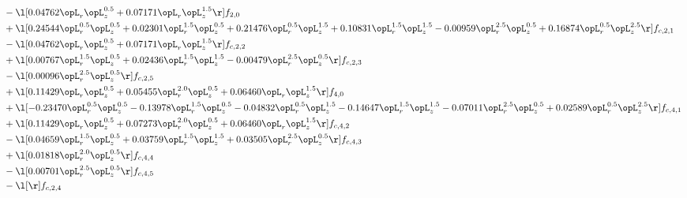 \begin{alignat}{2}
& - \l[  0.04762 \opL_r \opL_z^{0.5} +  0.07171 \opL_r \opL_z^{1.5}  \r] f_{2,0} \nonumber \\ 
& + \l[  0.24544 \opL_r^{0.5} \opL_z^{0.5} +  0.02301 \opL_r^{1.5} \opL_z^{0.5} +  0.21476 \opL_r^{0.5} \opL_z^{1.5} +  0.10831 \opL_r^{1.5} \opL_z^{1.5}   -0.00959 \opL_r^{2.5} \opL_z^{0.5} +  0.16874 \opL_r^{0.5} \opL_z^{2.5}  \r] f_{c,2,1} \nonumber \\ 
& - \l[  0.04762 \opL_r \opL_z^{0.5} +  0.07171 \opL_r \opL_z^{1.5}  \r] f_{c,2,2} \nonumber \\ 
& + \l[  0.00767 \opL_r^{1.5} \opL_z^{0.5} +  0.02436 \opL_r^{1.5} \opL_z^{1.5}   -0.00479 \opL_r^{2.5} \opL_z^{0.5}  \r] f_{c,2,3} \nonumber \\ 
& - \l[  0.00096 \opL_r^{2.5} \opL_z^{0.5}  \r] f_{c,2,5} \nonumber \\ 
& + \l[  0.11429 \opL_r \opL_z^{0.5} +  0.05455 \opL_r^{2.0} \opL_z^{0.5} +  0.06460 \opL_r \opL_z^{1.5}  \r] f_{4,0} \nonumber \\ 
& + \l[  -0.23470 \opL_r^{0.5} \opL_z^{0.5}   -0.13978 \opL_r^{1.5} \opL_z^{0.5}   -0.04832 \opL_r^{0.5} \opL_z^{1.5}   -0.14647 \opL_r^{1.5} \opL_z^{1.5}   -0.07011 \opL_r^{2.5} \opL_z^{0.5} +  0.02589 \opL_r^{0.5} \opL_z^{2.5}  \r] f_{c,4,1} \nonumber \\ 
& + \l[  0.11429 \opL_r \opL_z^{0.5} +  0.07273 \opL_r^{2.0} \opL_z^{0.5} +  0.06460 \opL_r \opL_z^{1.5}  \r] f_{c,4,2} \nonumber \\ 
& - \l[  0.04659 \opL_r^{1.5} \opL_z^{0.5} +  0.03759 \opL_r^{1.5} \opL_z^{1.5} +  0.03505 \opL_r^{2.5} \opL_z^{0.5}  \r] f_{c,4,3} \nonumber \\ 
& + \l[  0.01818 \opL_r^{2.0} \opL_z^{0.5}  \r] f_{c,4,4} \nonumber \\ 
& - \l[  0.00701 \opL_r^{2.5} \opL_z^{0.5}  \r] f_{c,4,5} \nonumber \\ 
& - \l[  \r] f_{c,2,4} \nonumber \\ 
\end{alignat} 


